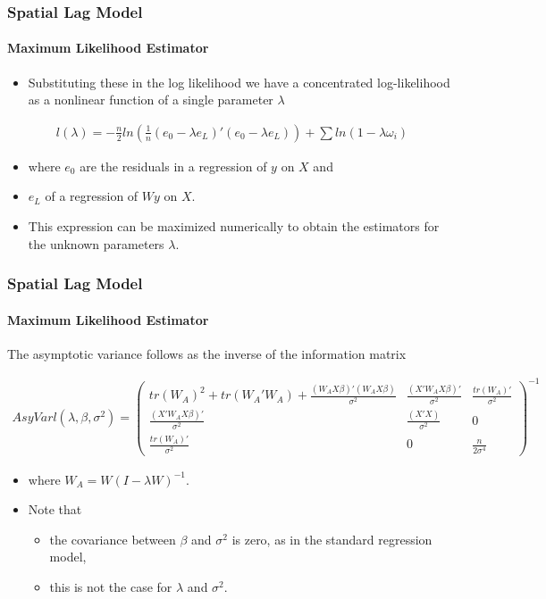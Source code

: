\documentclass[
  shownotes,
  xcolor={svgnames},
  hyperref={colorlinks,citecolor=DarkBlue,linkcolor=DarkRed,urlcolor=DarkBlue}
  ]{beamer}
\begin{document}
\begin{frame}[fragile]
\frametitle{Spatial Lag Model}
\framesubtitle{Maximum Likelihood Estimator}
\begin{itemize}
\item  Substituting these in the log likelihood we have a concentrated log-likelihood as a nonlinear function of a single parameter $\lambda$
\end{itemize}
 
 \bigskip
\begin{align}
l\left(\lambda\right)=-\frac{n}{2}ln\left(\frac{1}{n}(e_{0}-\lambda e_{L})'(e_{0}-\lambda e_{L})\right)+\sum ln(1-\lambda\omega_{i})
\end{align}
\bigskip
\begin{itemize}
\item where $e_{0}$ are the residuals in a regression of $y$ on $X$ and
\item $e_{L}$ of a regression of $Wy$ on $X$. 
\bigskip
\item This expression can be maximized numerically to obtain the estimators for the unknown parameters $\lambda$.
\end{itemize}



\end{frame}
\begin{frame}[fragile]
\frametitle{Spatial Lag Model}
\framesubtitle{Maximum Likelihood Estimator}
 The asymptotic variance follows as the inverse of the information matrix
\bigskip
\begin{scriptsize}
\begin{align}
AsyVarl\left(\lambda,\beta,\sigma^{2}\right)=\left(\begin{array}{ccc}
tr(W_{A})^{2}+tr(W_{A}'W_{A})+\frac{(W_{A}X\beta)'(W_{A}X\beta)}{\sigma^{2}} & \frac{(X'W_{A}X\beta)'}{\sigma^{2}} & \frac{tr(W_{A})'}{\sigma^{2}}\\
\frac{(X'W_{A}X\beta)'}{\sigma^{2}} & \frac{(X'X)}{\sigma^{2}} & 0\\
\frac{tr(W_{A})'}{\sigma^{2}} & 0 & \frac{n}{2\sigma^{4}} 
\end{array}\right)^{-1}
\end{align}
\end{scriptsize}

\bigskip
\begin{itemize}
\item where $W_{A}=W(I-\lambda W)^{-1}$. 
\item Note that 
\begin{itemize}
  \item the covariance between $\beta$ and $\sigma^{2}$ is zero, as in the standard regression model, 
  \item this is not the case for $\lambda$ and $\sigma^{2}.$ 
\end{itemize}

\end{itemize}


\end{frame}
\end{document}
